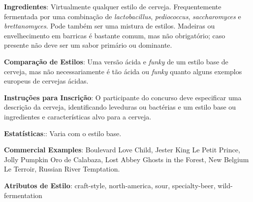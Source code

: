 \textbf{Ingredientes}: Virtualmente qualquer estilo de cerveja. Frequentemente fermentada por uma combinação de \textit{lactobacillus}, \textit{pediococcus}, \textit{saccharomyces} e \textit{brettanomyces}. Pode também ser uma mistura de estilos. Madeiras ou envelhecimento em barricas é bastante comum, mas não obrigatório; caso presente não deve ser um sabor primário ou dominante.

\textbf{Comparação de Estilos}: Uma versão ácida e \textit{funky} de um estilo base de cerveja, mas não necessariamente é tão ácida ou \textit{funky} quanto alguns exemplos europeus de cervejas ácidas.

\textbf{Instruções para Inscrição}: O participante do concurso deve especificar uma descrição da cerveja, identificando leveduras ou bactérias e um estilo base ou ingredientes e características alvo para a cerveja.

\textbf{Estatísticas}:: Varia com o estilo base.

\textbf{Commercial Examples}: Boulevard Love Child, Jester King Le Petit Prince, Jolly Pumpkin Oro de Calabaza, Lost Abbey Ghosts in the Forest, New Belgium Le Terroir, Russian River Temptation.

\textbf{Atributos de Estilo}: craft-style, north-america, sour, specialty-beer, wild-fermentation
